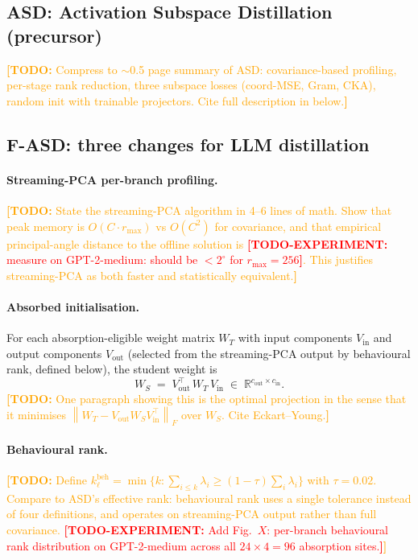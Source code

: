 \documentclass{article}
\newcommand{\todo}[1]{\textcolor{orange}{\textbf{[TODO:} #1\textbf{]}}}
\newcommand{\todoexp}[1]{\textcolor{red}{\textbf{[TODO-EXPERIMENT:} #1\textbf{]}}}
\newcommand{\R}{\mathbb{R}}
\newcommand{\norm}[1]{\left\lVert#1\right\rVert}
\newcommand{\Vin}{V_{\mathrm{in}}}
\newcommand{\Vout}{V_{\mathrm{out}}}
\newcommand{\fasd}{\texorpdfstring{\textsc{F-ASD}}{F-ASD}}
\newcommand{\asd}{\texorpdfstring{\textsc{ASD}}{ASD}}
\begin{document}
\subsection{ASD: Activation Subspace Distillation (precursor)}
\label{sec:method:asd}
\todo{Compress to $\sim$0.5 page summary of \asd{}: covariance-based
profiling, per-stage rank reduction, three subspace losses (coord-MSE, Gram,
CKA), random init with trainable projectors. Cite full description in
\Cref{app:asd} below.}

\subsection{\fasd{}: three changes for LLM distillation}
\label{sec:method:fasd}

\paragraph{Streaming-PCA per-branch profiling.}
\todo{State the streaming-PCA algorithm in 4--6 lines of math. Show that
peak memory is $O(C \cdot r_{\max})$ vs $O(C^2)$ for covariance, and that
empirical principal-angle distance to the offline solution is
\todoexp{measure on GPT-2-medium: should be $<2^\circ$ for $r_{\max}=256$}.
This justifies streaming-PCA as both faster and statistically equivalent.}

\paragraph{Absorbed initialisation.}
For each absorption-eligible weight matrix $W_T$ with input components $\Vin$
and output components $\Vout$ (selected from the streaming-PCA output by
behavioural rank, defined below), the student weight is
\begin{equation}
\label{eq:absorb}
W_S \;=\; \Vout^\top \, W_T \, \Vin \;\in\; \R^{c_{\mathrm{out}} \times c_{\mathrm{in}}}.
\end{equation}
\todo{One paragraph showing this is the optimal projection in the sense
that it minimises $\norm{W_T - \Vout W_S \Vin^\top}_F$ over $W_S$. Cite
Eckart--Young.}

\paragraph{Behavioural rank.}
\todo{Define $k^{\mathrm{beh}}_\ell = \min\{k : \sum_{i \le k} \lambda_i \ge
(1-\tau) \sum_i \lambda_i\}$ with $\tau = 0.02$. Compare to ASD's effective
rank: behavioural rank uses a single tolerance instead of four definitions,
and operates on streaming-PCA output rather than full covariance.
\todoexp{Add Fig.~$X$: per-branch behavioural rank distribution on
GPT-2-medium across all $24 \times 4 = 96$ absorption sites.}}
\end{document}

